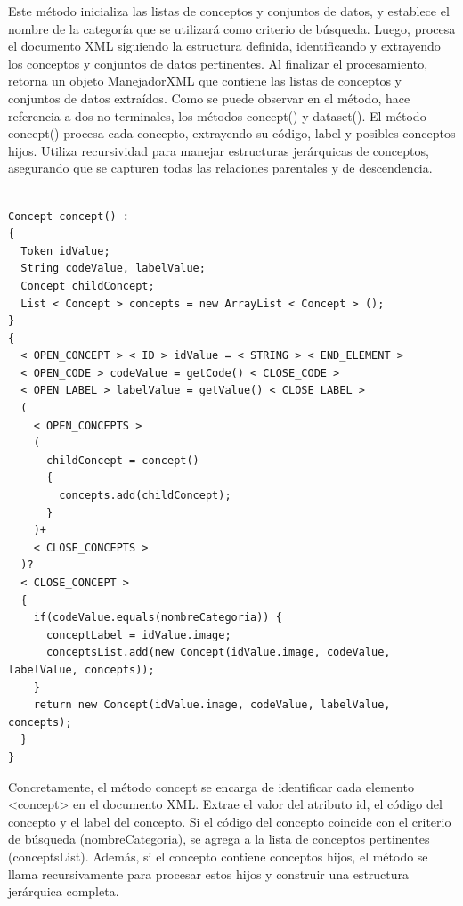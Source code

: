 Este método inicializa las listas de conceptos y conjuntos de datos, y establece el nombre de la categoría que se utilizará como criterio de búsqueda. Luego, procesa el documento XML siguiendo la estructura definida, identificando y extrayendo los conceptos y conjuntos de datos pertinentes. Al finalizar el procesamiento, retorna un objeto ManejadorXML que contiene las listas de conceptos y conjuntos de datos extraídos.
Como se puede observar en el método, hace referencia a dos no-terminales, los métodos concept() y dataset().
El método concept() procesa cada concepto, extrayendo su código, label y posibles conceptos hijos. Utiliza recursividad para manejar estructuras jerárquicas de conceptos, asegurando que se capturen todas las relaciones parentales y de descendencia.

\lstset{inputencoding=utf8/latin1}
\begin{lstlisting}
    
Concept concept() :
{
  Token idValue;
  String codeValue, labelValue;
  Concept childConcept; 
  List < Concept > concepts = new ArrayList < Concept > ();
}
{
  < OPEN_CONCEPT > < ID > idValue = < STRING > < END_ELEMENT > 
  < OPEN_CODE > codeValue = getCode() < CLOSE_CODE > 
  < OPEN_LABEL > labelValue = getValue() < CLOSE_LABEL >
  (
    < OPEN_CONCEPTS >
    (
      childConcept = concept()
      {
        concepts.add(childConcept);
      }
    )+
    < CLOSE_CONCEPTS >
  )?
  < CLOSE_CONCEPT >
  {
    if(codeValue.equals(nombreCategoria)) {
      conceptLabel = idValue.image;
      conceptsList.add(new Concept(idValue.image, codeValue, labelValue, concepts));
	}
	return new Concept(idValue.image, codeValue, labelValue, concepts);
  }
}
\end{lstlisting}

Concretamente, el método concept se encarga de identificar cada elemento <concept> en el documento XML. Extrae el valor del atributo id, el código del concepto y el label del concepto. Si el código del concepto coincide con el criterio de búsqueda (nombreCategoria), se agrega a la lista de conceptos pertinentes (conceptsList). Además, si el concepto contiene conceptos hijos, el método se llama recursivamente para procesar estos hijos y construir una estructura jerárquica completa.

